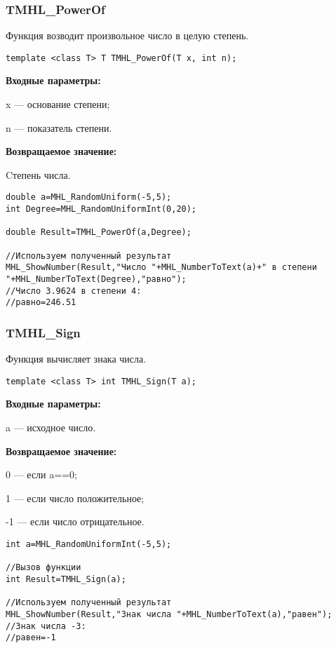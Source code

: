 \documentclass[a4paper,12pt]{article}
\begin{document}
\subsubsection{TMHL\_PowerOf}\label{TMHL_PowerOf}

Функция возводит произвольное число в целую степень.


\begin{lstlisting}[label=code_syntax_TMHL_PowerOf,caption=Синтаксис]
template <class T> T TMHL_PowerOf(T x, int n);
\end{lstlisting}

\textbf{Входные параметры:}  
 
x --- основание степени;
 
n --- показатель степени.

\textbf{Возвращаемое значение:}

Cтепень числа.


\begin{lstlisting}[label=code_use_TMHL_PowerOf,caption=Пример использования]
double a=MHL_RandomUniform(-5,5);
int Degree=MHL_RandomUniformInt(0,20);

double Result=TMHL_PowerOf(a,Degree);

//Используем полученный результат
MHL_ShowNumber(Result,"Число "+MHL_NumberToText(a)+" в степени "+MHL_NumberToText(Degree),"равно");
//Число 3.9624 в степени 4:
//равно=246.51
\end{lstlisting}

\subsubsection{TMHL\_Sign}\label{TMHL_Sign}

Функция вычисляет знака числа.


\begin{lstlisting}[label=code_syntax_TMHL_Sign,caption=Синтаксис]
template <class T> int TMHL_Sign(T a);
\end{lstlisting}

\textbf{Входные параметры:}

 a --- исходное число.

\textbf{Возвращаемое значение:}

 0 --- если a==0;
 
 1 --- если число положительное;
 
 -1 --- если число отрицательное.


\begin{lstlisting}[label=code_use_TMHL_Sign,caption=Пример использования]
int a=MHL_RandomUniformInt(-5,5);

//Вызов функции
int Result=TMHL_Sign(a);

//Используем полученный результат
MHL_ShowNumber(Result,"Знак числа "+MHL_NumberToText(a),"равен");
//Знак числа -3:
//равен=-1
\end{lstlisting}
\end{document}
